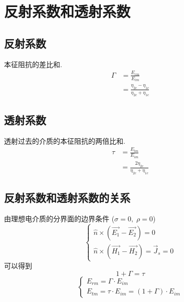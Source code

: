 \documentclass[a4paper]{report}
\begin{document}
\section{反射系数和透射系数}
\subsection{反射系数}
本征阻抗的差比和. 
\begin{align*}
    \Gamma&=\frac{E_{rm}}{E_{im}}\\
    &=\frac{\eta_{2c}-\eta_{1c}}{\eta_{2c}+\eta_{1c}}
\end{align*}\subsection{透射系数}
透射过去的介质的本征阻抗的两倍比和. 
\begin{align*}
    \tau&=\frac{E_{tm}}{E_{im}}\\
    &=\frac{2\eta_{2c}}{\eta_{2c}+\eta_{1c}}
\end{align*}
\subsection{反射系数和透射系数的关系}
由理想电介质的分界面的边界条件 ($\sigma=0,\;\rho=0$)
$$\begin{cases}
    \hat{n}\times(\vec{E _1}-\vec{E _2}  )=0\\
    \hat{n}\times(\vec{H _1}-\vec{H _2}  )=\vec{J}_s=0
\end{cases}$$
可以得到
$$1+\Gamma=\tau$$
$$
\begin{cases}
    E_{rm}=\Gamma\cdot E_{im}\\
    E_{tm}=\tau\cdot E_{im}=(1+\Gamma)\cdot E_{im}
\end{cases}$$
\end{document}
